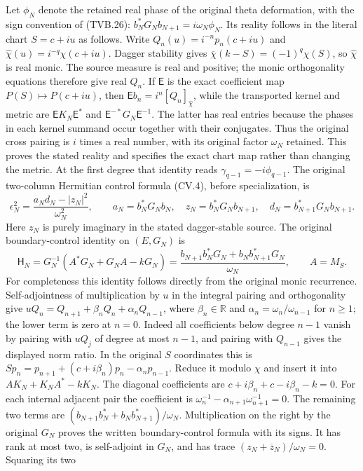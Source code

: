 \documentclass[11pt,a4paper]{article}
\newcommand{\R}{\mathbb R}
\begin{document}
Let $\phi_N$ denote the retained real phase of the original
theta deformation, with the sign convention of (TVB.26):
$b_N^*G_Nb_{N+1}=i\omega_N\phi_N$.
Its reality follows in the literal chart $S=c+iu$ as follows.
Write $Q_n(u)=i^{-n}p_n(c+iu)$ and
$\widehat\chi(u)=i^{-q}\chi(c+iu)$. Dagger stability gives
$\overline\chi(k-S)=(-1)^q\chi(S)$, so $\widehat\chi$
is real monic. The source measure is real and positive; the
monic orthogonality equations therefore give real $Q_n$.
If $\mathsf E$ is the exact coefficient map
$P(S)\mapsto P(c+iu)$, then
$\mathsf E b_n=i^n[Q_n]_{\widehat\chi}$, while the transported
kernel and metric are $\mathsf E K_N\mathsf E^*$ and
$\mathsf E^{-*}G_N\mathsf E^{-1}$.
The latter has real entries because the phases in each kernel
summand occur together with their conjugates. Thus the original
cross pairing is $i$ times a real number, with its original
factor $\omega_N$ retained. This proves the stated reality
and specifies the exact chart map rather than changing the metric.
At the first degree that identity reads
$\gamma_{q-1}=-i\phi_{q-1}$. The original two-column Hermitian
control formula (CV.4), before specialization, is
\[
 \epsilon_N^2=
 \frac{a_N d_N-|z_N|^2}{\omega_N^2},\qquad
 a_N=b_N^*G_Nb_N,\quad z_N=b_N^*G_Nb_{N+1},\quad
 d_N=b_{N+1}^*G_Nb_{N+1}.
 \tag{CJ.5}
\]
Here $z_N$ is purely imaginary in the stated dagger-stable
source. The original boundary-control identity on $(E,G_N)$ is
\[
 \mathsf H_N=G_N^{-1}(A^*G_N+G_NA-kG_N)
 =\frac{b_{N+1}b_N^*G_N+b_Nb_{N+1}^*G_N}{\omega_N},
 \qquad A=M_S.
\]
For completeness this identity follows directly from the original
monic recurrence. Self-adjointness of multiplication by $u$ in
the integral pairing and orthogonality give
$uQ_n=Q_{n+1}+\beta_nQ_n+\alpha_nQ_{n-1}$, where
$\beta_n\in\R$ and $\alpha_n=\omega_n/\omega_{n-1}$ for
$n\ge1$; the lower term is zero at $n=0$.
Indeed all coefficients below degree $n-1$ vanish by pairing
with $uQ_j$ of degree at most $n-1$, and pairing with
$Q_{n-1}$ gives the displayed norm ratio. In the original
$S$ coordinates this is
$Sp_n=p_{n+1}+(c+i\beta_n)p_n-\alpha_np_{n-1}$.
Reduce it modulo $\chi$ and insert it into
$AK_N+K_NA^*-kK_N$. The diagonal coefficients are
$c+i\beta_n+c-i\beta_n-k=0$. For each internal adjacent
pair the coefficient is
$\omega_n^{-1}-\alpha_{n+1}\omega_{n+1}^{-1}=0$.
The remaining two terms are
$(b_{N+1}b_N^*+b_Nb_{N+1}^*)/\omega_N$.
Multiplication on the right by the original $G_N$ proves
the written boundary-control formula with its signs.
It has rank at most two, is self-adjoint in $G_N$, and has
trace $(z_N+\overline z_N)/\omega_N=0$. Squaring its two
\end{document}
